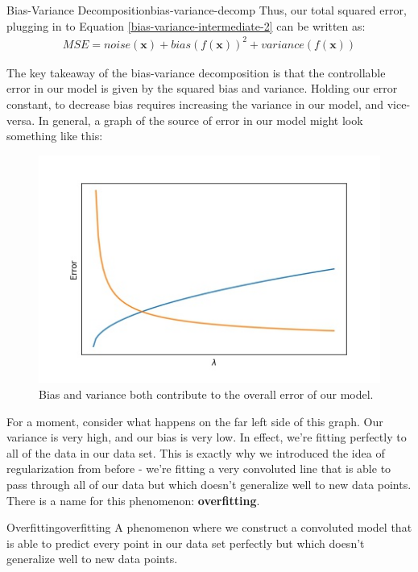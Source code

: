 \begin{derivation}{Bias-Variance Decomposition}{bias-variance-decomp}
    Thus, our total squared error, plugging in to Equation \ref{bias-variance-intermediate-2} can be written as:
    \begin{align*}
        \boxed{\textit{MSE} = \textit{noise}(\textbf{x}) + \textit{bias}(f(\textbf{x}))^{2} + \textit{variance}(f(\textbf{x}))}
    \end{align*}
\end{derivation}

The key takeaway of the bias-variance decomposition is that the controllable error in our model is given by the squared bias and variance. Holding our error constant, to decrease bias requires increasing the variance in our model, and vice-versa. In general, a graph of the source of error in our model might look something like this:

\begin{figure}
    \centering
    \includegraphics[width=0.5\paperwidth]{../LinearRegression/fig/biasvariance_GEN.jpg}
    \caption{Bias and variance both contribute to the overall error of our model.}
    \label{fig:bias-vs-variance}
\end{figure}

For a moment, consider what happens on the far left side of this graph. Our variance is very high, and our bias is very low. In effect, we're fitting perfectly to all of the data in our data set. This is exactly why we introduced the idea of regularization from before - we're fitting a very convoluted line that is able to pass through all of our data but which doesn't generalize well to new data points. There is a name for this phenomenon: \textbf{overfitting}.

\begin{definition}{Overfitting}{overfitting}
    A phenomenon where we construct a convoluted model that is able to predict every point in our data set perfectly but which doesn't generalize well to new data points.
\end{definition}

